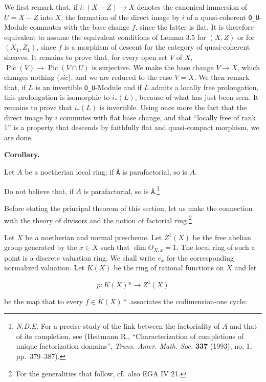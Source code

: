 \documentclass[
]{article}
\begin{document}
We first remark that, if \(i: (X - Z) \to X\) denotes the canonical
immersion of \(U = X - Z\) into \(X\), the formation of the direct image
by \(i\) of a quasi-coherent \texttt{O\_U}-Module commutes with the base
change \(f\), since the latter is flat. It is therefore equivalent to
assume the equivalent conditions of Lemma 3.5 for \((X, Z)\) or for
\((X_{1}, Z_{1})\), since \(f\) is a morphism of descent for the
category of quasi-coherent sheaves. It remains to prove that, for every
open set \(V\) of \(X\),
\(\operatorname{Pic}(V) \to \operatorname{Pic}(V \cap U)\) is
surjective. We make the base change \(V \to X\), which changes nothing
(\emph{sic}), and we are reduced to the case \(V = X\). We then remark
that, if \(L\) is an invertible \texttt{O\_U}-Module and if \(L\) admits
a locally free prolongation, this prolongation is isomorphic to
\(i_{*}(L)\), because of what has just been seen. It remains to prove
that \(i_{*}(L)\) is invertible. Using once more the fact that the
direct image by \(i\) commutes with flat base change, and that ``locally
free of rank 1'' is a property that descends by faithfully flat and
quasi-compact morphism, we are done.

\textbf{Corollary.}

Let \(A\) be a noetherian local ring; if \texttt{Â} is parafactorial, so
is \(A\).

Do not believe that, if \(A\) is parafactorial, so is
\texttt{Â}.\footnote{\emph{N.D.E.} For a precise study of the link
  between the factoriality of \(A\) and that of its completion, see
  (Heitmann R., ``Characterization of completions of unique
  factorization domains'', \emph{Trans. Amer. Math. Soc.} \textbf{337}
  (1993), no. 1, pp.~379--387).}

Before stating the principal theorem of this section, let us make the
connection with the theory of divisors and the notion of factorial
ring.\footnote{For the generalities that follow, cf.~also EGA IV 21.}

Let \(X\) be a noetherian and normal prescheme. Let \(Z^{1}(X)\) be the
free abelian group generated by the \(x \in X\) such that
\(\dim O_{X,x} = 1\). The local ring of such a point is a discrete
valuation ring. We shall write \(v_{x}\) for the corresponding
normalized valuation. Let \(K(X)\) be the ring of rational functions on
\(X\) and let

\[
p: K(X)* \longrightarrow Z^{1}(X)
\]

be the map that to every \(f \in K(X)*\) associates the codimension-one
cycle:
\end{document}
